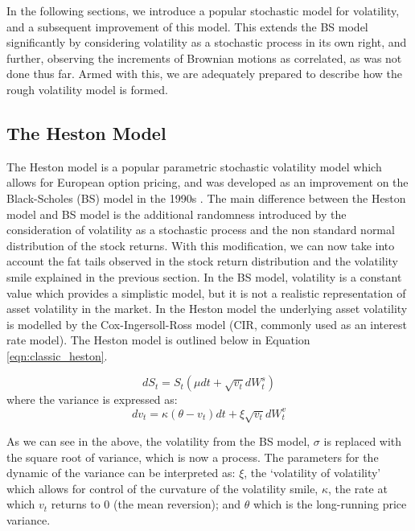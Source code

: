 \documentclass[12pt,oneside]{article}
\begin{document}
In the following sections, we introduce a popular stochastic model for volatility, and a subsequent improvement of this model. This extends the BS model significantly by considering volatility as a stochastic process in its own right, and further, observing the increments of Brownian motions as correlated, as was not done thus far. Armed with this, we are adequately prepared to describe how the rough volatility model is formed.


\subsection{The Heston Model}
The Heston model is a popular parametric stochastic volatility model which allows for European option pricing, and was developed as an improvement on the Black-Scholes (BS) model in the 1990s \cite{Douglas1993}. The main difference between the Heston model and BS model is the additional randomness introduced by the consideration of volatility as a stochastic process and the non standard normal distribution of the stock returns. With this modification, we can now take into account the fat tails observed in the stock return distribution and the volatility smile explained in the previous section. In the BS model, volatility is a constant value which provides a simplistic model, but it is not a realistic representation of asset volatility in the market. In the Heston model the underlying asset volatility is modelled by the Cox-Ingersoll-Ross model (CIR, commonly used as an interest rate model). The Heston model is outlined below in Equation \ref{eqn:classic_heston}.

\begin{equation}
\label{eqn:classic_heston}
dS_t= S_t(\mu dt + \sqrt{v_t} dW_t^{s})
\end{equation}
where the variance is expressed as: 
\begin{equation}
\label{eqn:classic_heston_var}
dv_t = \kappa (\theta - v_t)dt + \xi\sqrt{v_t}dW_t^{v}
\end{equation}

As we can see in the above, the volatility from the BS model, $\sigma$ is replaced with the square root of variance, which is now a process. The parameters for the dynamic of the variance can be interpreted as: $\xi$, the `volatility of volatility' which allows for control of the curvature of the volatility smile, $\kappa$, the rate at which $v_t$ returns to 0 (the mean reversion); and $\theta$ which is the long-running price variance. 
\\
\end{document}
